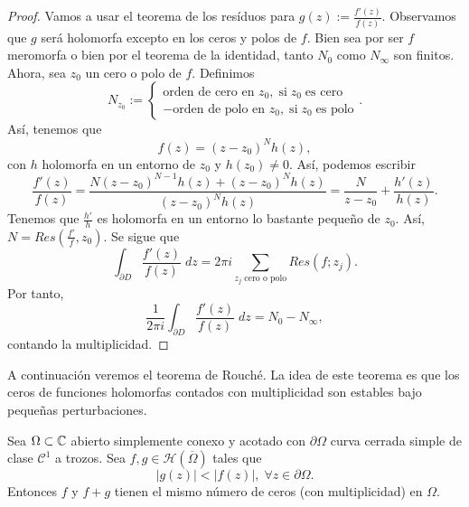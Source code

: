 \begin{proof}
Vamos a usar el teorema de los resíduos para $\displaystyle g\left(z\right):=\frac{f'\left(z\right)}{f\left(z\right)} $. Observamos que $\displaystyle g $ será holomorfa excepto en los ceros y polos de $\displaystyle f $. Bien sea por ser $\displaystyle f $ meromorfa o bien por el teorema de la identidad, tanto $\displaystyle N_{0} $ como $\displaystyle N_{\infty} $ son finitos. Ahora, sea $\displaystyle z_{0} $ un cero o polo de $\displaystyle f $. Definimos 
\[N_{z_{0}}:= 
\begin{cases}
\text{orden de cero en $\displaystyle z_{0} $}, \; \text{si} \; z_{0}\; \text{es cero} \\
-\text{orden de polo en $\displaystyle z_{0} $}, \; \text{si} \; z_{0} \; \text{es polo}
\end{cases}
.\]
Así, tenemos que 
\[f\left(z\right)=\left(z-z_{0}\right)^{N}h\left(z\right) ,\]
con $\displaystyle h $ holomorfa en un entorno de $\displaystyle z_{0} $ y $\displaystyle h\left(z_{0}\right)\neq 0 $. Así, podemos escribir
\[\frac{f'\left(z\right)}{f\left(z\right)} = \frac{N\left(z-z_{0}\right)^{N-1}h\left(z\right)+\left(z-z_{0}\right)^{N}h\left(z\right)}{\left(z-z_{0}\right)^{N}h\left(z\right)} = \frac{N}{z-z_{0}} + \frac{h'\left(z\right)}{h\left(z\right)} .\]
Tenemos que $\displaystyle \frac{h'}{h} $ es holomorfa en un entorno lo bastante pequeño de $\displaystyle z_{0} $. Así, $\displaystyle N = Res\left(\frac{f'}{f}, z_{0}\right) $. Se sigue que 
\[\int _{\partial D}\frac{f'\left(z\right)}{f\left(z\right)} \; dz = 2\pi i\sum_{z_{j} \; \text{cero o polo}}Res\left(f; z_{j}\right) .\]
Por tanto, 
\[\frac{1}{2\pi i}\int _{\partial D}\frac{f'\left(z\right)}{f\left(z\right)} \; dz= N_{0}-N_{\infty} ,\]
contando la multiplicidad.
\end{proof}
A continuación veremos el teorema de Rouché. La idea de este teorema es que los ceros de funciones holomorfas contados con multiplicidad son estables bajo pequeñas perturbaciones. 
\begin{theorem}
Sea $\displaystyle \Omega\subset\mathbb{C} $ abierto simplemente conexo y acotado con $\displaystyle \partial \Omega  $ curva cerrada simple de clase $\displaystyle \mathcal{C}^{1} $ a trozos. Sea $\displaystyle f,g \in \mathcal{H}\left(\overline{\Omega }\right) $ tales que 
\[ \left|g\left(z\right)\right| < \left|f\left(z\right)\right|, \; \forall z \in \partial \Omega  .\]
Entonces $\displaystyle f $ y $\displaystyle f + g $ tienen el mismo número de ceros (con multiplicidad) en $\displaystyle \Omega  $. 
\end{theorem}

